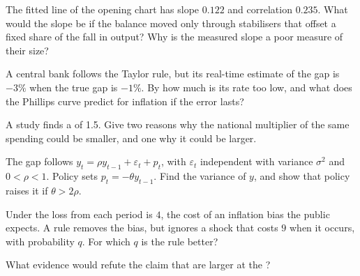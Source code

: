 \begin{exercise}[$\star\star$]\label{exo:b1:stabilisation-policy:slope}
The fitted line of the opening chart has slope $0.122$ and correlation $0.235$.
What would the slope be if the balance moved only through stabilisers that
offset a fixed share of the fall in output? Why is the measured slope a
poor measure of their size?
\end{exercise}

\begin{exercise}[$\star\star$]\label{exo:b1:stabilisation-policy:realtime}
A central bank follows the Taylor rule, but its real-time estimate of the
gap is $-3\%$ when the true gap is $-1\%$. By how much is its rate too low, and
what does the Phillips curve predict for inflation if the error lasts?
\end{exercise}

\begin{exercise}[$\star\star$]\label{exo:b1:stabilisation-policy:local}
A study finds a  of 1.5. Give two reasons why the national
multiplier of the same spending could be smaller, and one why it could be
larger.
\end{exercise}

\begin{exercise}[$\star\star\star$]\label{exo:b1:stabilisation-policy:ar}
The gap follows $y_t = \rho y_{t-1} + \varepsilon_t + p_t$, with $\varepsilon_t$ independent with variance $\sigma^2$
and $0 < \rho < 1$. Policy sets $p_t = -\theta y_{t-1}$. Find the variance of $y$, and show that
policy raises it if $\theta > 2\rho$.
\end{exercise}

\begin{exercise}[$\star\star\star$]\label{exo:b1:stabilisation-policy:rule-disc}
Under  the loss from each period is $4$, the cost of an inflation
bias the public expects. A rule removes the bias, but ignores a shock that
costs $9$ when it occurs, with probability $q$. For which $q$ is the rule better?
\end{exercise}

\begin{exercise}[$\star\star\star$]\label{exo:b1:stabilisation-policy:refute}
What evidence would refute the claim that  are larger at
the ?
\end{exercise}

